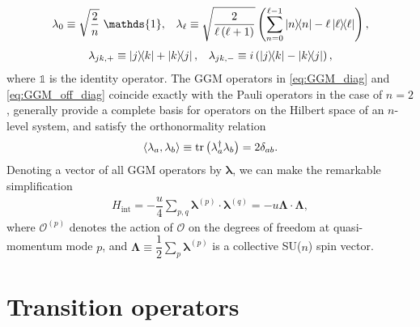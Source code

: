 \documentclass[nofootinbib,notitlepage,11pt]{revtex4-2}
\renewcommand{\t}{\text} %
\newcommand{\f}[2]{\dfrac{#1}{#2}} %
\newcommand{\p}[1]{\left(#1\right)} %
\newcommand{\bk}{\Braket} %
\renewcommand{\v}{\bm} %
\renewcommand{\c}{\cdot} %
\newcommand{\1}{\mathds{1}}
\renewcommand{\O}{\mathcal{O}}
\begin{document}
\begin{align}
  \lambda_0 \equiv \sqrt{\f{2}{n}}~ \1,
  &&
  \lambda_\ell \equiv \sqrt{\f{2}{\ell\p{\ell+1}}}
  \p{\sum_{n=0}^{\ell-1}\op{n} - \ell \op{\ell}},
  \label{eq:GGM_diag}
\end{align}
\begin{align}
  \lambda_{jk,+} \equiv \op{j}{k} + \op{k}{j},
  &&
  \lambda_{jk,-} \equiv i\p{\op{j}{k} - \op{k}{j}},
  \label{eq:GGM_off_diag}
\end{align}
where $\1$ is the identity operator.  The GGM operators in
\eqref{eq:GGM_diag} and \eqref{eq:GGM_off_diag} coincide exactly with
the Pauli operators in the case of $n=2$, generally provide a complete
basis for operators on the Hilbert space of an $n$-level system, and
satisfy the orthonormality relation
\begin{align}
  \bk{\lambda_a,\lambda_b}
  \equiv \tr\p{\lambda_a^\dag\lambda_b}
  = 2\delta_{ab}.
  \label{eq:GGM_inner}
\end{align}
Denoting a vector of all GGM operators by $\v\lambda$, we can make the
remarkable simplification
\begin{align}
  H_{\t{int}}
  = -\f{u}{4} \sum_{p,q} \v\lambda^{(p)} \c \v\lambda^{(q)}
  = -u \v\Lambda \c \v\Lambda,
  \label{eq:H_int_GGM}
\end{align}
where $\O^{(p)}$ denotes the action of $\O$ on the degrees of freedom
at quasi-momentum mode $p$, and
$\v\Lambda\equiv\f12\sum_p\v\lambda^{(p)}$ is a collective SU($n$)
spin vector.

\section{Transition operators}
\end{document}
